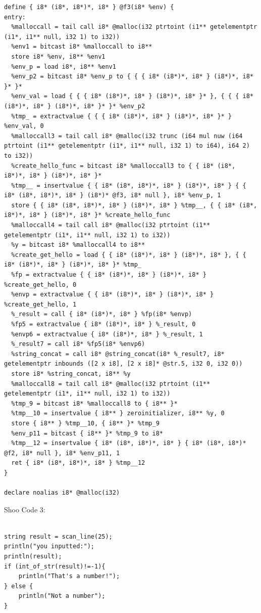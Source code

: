 \documentclass[12pt]{article}
\begin{document}
\begin{mdframed}[hidealllines=true,backgroundcolor=green!10]
\begin{lstlisting}
define { i8* (i8*, i8*)*, i8* } @f3(i8* %env) {
entry:
  %malloccall = tail call i8* @malloc(i32 ptrtoint (i1** getelementptr (i1*, i1** null, i32 1) to i32))
  %env1 = bitcast i8* %malloccall to i8**
  store i8* %env, i8** %env1
  %env_p = load i8*, i8** %env1
  %env_p2 = bitcast i8* %env_p to { { { i8* (i8*)*, i8* } (i8*)*, i8* }* }*
  %env_val = load { { { i8* (i8*)*, i8* } (i8*)*, i8* }* }, { { { i8* (i8*)*, i8* } (i8*)*, i8* }* }* %env_p2
  %tmp_ = extractvalue { { { i8* (i8*)*, i8* } (i8*)*, i8* }* } %env_val, 0
  %malloccall3 = tail call i8* @malloc(i32 trunc (i64 mul nuw (i64 ptrtoint (i1** getelementptr (i1*, i1** null, i32 1) to i64), i64 2) to i32))
  %create_hello_func = bitcast i8* %malloccall3 to { { i8* (i8*, i8*)*, i8* } (i8*)*, i8* }*
  %tmp__ = insertvalue { { i8* (i8*, i8*)*, i8* } (i8*)*, i8* } { { i8* (i8*, i8*)*, i8* } (i8*)* @f3, i8* null }, i8* %env_p, 1
  store { { i8* (i8*, i8*)*, i8* } (i8*)*, i8* } %tmp__, { { i8* (i8*, i8*)*, i8* } (i8*)*, i8* }* %create_hello_func
  %malloccall4 = tail call i8* @malloc(i32 ptrtoint (i1** getelementptr (i1*, i1** null, i32 1) to i32))
  %y = bitcast i8* %malloccall4 to i8**
  %create_get_hello = load { { i8* (i8*)*, i8* } (i8*)*, i8* }, { { i8* (i8*)*, i8* } (i8*)*, i8* }* %tmp_
  %fp = extractvalue { { i8* (i8*)*, i8* } (i8*)*, i8* } %create_get_hello, 0
  %envp = extractvalue { { i8* (i8*)*, i8* } (i8*)*, i8* } %create_get_hello, 1
  %_result = call { i8* (i8*)*, i8* } %fp(i8* %envp)
  %fp5 = extractvalue { i8* (i8*)*, i8* } %_result, 0
  %envp6 = extractvalue { i8* (i8*)*, i8* } %_result, 1
  %_result7 = call i8* %fp5(i8* %envp6)
  %string_concat = call i8* @string_concat(i8* %_result7, i8* getelementptr inbounds ([2 x i8], [2 x i8]* @str.5, i32 0, i32 0))
  store i8* %string_concat, i8** %y
  %malloccall8 = tail call i8* @malloc(i32 ptrtoint (i1** getelementptr (i1*, i1** null, i32 1) to i32))
  %tmp_9 = bitcast i8* %malloccall8 to { i8** }*
  %tmp__10 = insertvalue { i8** } zeroinitializer, i8** %y, 0
  store { i8** } %tmp__10, { i8** }* %tmp_9
  %env_p11 = bitcast { i8** }* %tmp_9 to i8*
  %tmp__12 = insertvalue { i8* (i8*, i8*)*, i8* } { i8* (i8*, i8*)* @f2, i8* null }, i8* %env_p11, 1
  ret { i8* (i8*, i8*)*, i8* } %tmp__12
}

declare noalias i8* @malloc(i32)

\end{lstlisting}
\end{mdframed}

Shoo Code 3:\\
\\
\begin{mdframed}[hidealllines=true,backgroundcolor=blue!10]
\begin{lstlisting}
string result = scan_line(25);
println("you inputted:");
println(result);
if (int_of_str(result)!=-1){
	println("That's a number!");
} else {
	println("Not a number");
}
\end{lstlisting}
\end{mdframed}
\end{document}
